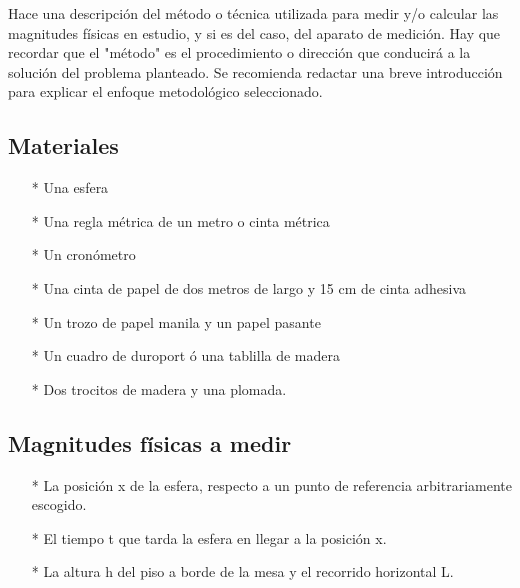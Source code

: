 \documentclass[osajnl,twocolumn,showpacs,superscriptaddress,10pt]{revtex4-1}
\begin{document}
Hace una descripción del método o técnica utilizada para medir y/o calcular las
magnitudes físicas en estudio, y si es del caso, del aparato de medición. Hay que
recordar que el "método" es el procedimiento o dirección que conducirá a la solución
del problema planteado. Se recomienda redactar una breve introducción para explicar
el enfoque metodológico seleccionado.\\

\subsection{Materiales}
\begin{itemize}
\item[*] Una esfera
\item[*] Una regla métrica de un metro o cinta métrica
\item[*] Un cronómetro
\item[*] Una cinta de papel de dos metros de largo y 15 cm de cinta adhesiva
\item[*] Un trozo de papel manila y un papel pasante
\item[*] Un cuadro de duroport ó una tablilla de madera
\item[*] Dos trocitos de madera y una plomada.

\end{itemize}


\subsection{Magnitudes físicas a medir}
\begin{itemize}
\item[*] La posición x de la esfera, respecto a un punto de referencia arbitrariamente escogido.
\item[*] El tiempo t que tarda la esfera en llegar a la posición x.
\item[*] La altura h del piso a borde de la mesa y el recorrido horizontal L.
\end{itemize}
\end{document}
